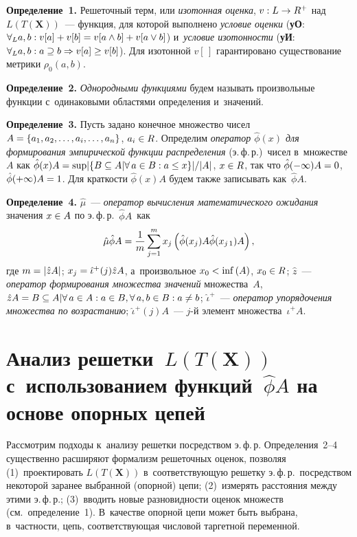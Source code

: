 \begin{multicols}{2}
     \noindent
     \textbf{Определение~1.} Решеточный терм, или \textit{изотонная 
оценка}, $v: L\hm\to R^+$ над $L(T(\mathbf{X}))$~--- функция, для которой 
выполнено \textit{условие оценки} (\textbf{уО}:  $\forall_L a,b: 
v[a]\hm+v[b]\hm=v[a\wedge b]\hm+ v[a\vee b]$) и~\textit{условие изотонности} 
(\textbf{уИ}: $\forall_L a,b: a \hm\supseteq b \hm\Rightarrow  v[a]\hm\geq v[b]$). Для изотонной 
$v[\,]$ гарантировано существование метрики $\rho_0(a,b)$.
     \smallskip
     
     \noindent
     \textbf{Определение~2.} \textit{Однородными функциями} будем 
называть произвольные функции с~одинаковыми областями определения и~значений. 
     
     \smallskip
     \noindent
     \textbf{Определение~3.} Пусть задано конечное множество чисел 
$A\hm= \{a_1,a_2, \ldots , a_i, \ldots, a_n\}$, $a_i\hm\in R$. Определим 
\textit{оператор $\hat{\phi}(x)$ для формирования эмпирической функции 
распределения} (э.\,ф.\,р.)\ чисел в~множестве~$A$ как $\hat{\phi}(x) A\hm= 
\mathrm{sup}\vert \{B\hm\subseteq A\vert \forall\,a\hm\in B: a\hm\leq x\}\vert / 
\vert A\vert$, $x\hm\in R$, так что $\hat{\phi}(-\infty) A\hm=0$, $\hat{\phi} 
(+\infty)A\hm=1$. Для краткости $\hat{\phi}(x)A$ будем также записывать 
как~$\hat{\phi}A$. 
     
     \smallskip
     
     \noindent
     \textbf{Определение~4.} $\hat{\mu}$~--- \textit{оператор вычисления 
математического ожидания} значения $x\hm\in A$ по э.\,ф.\,р.~$\hat{\phi}A$~как 
$$
\hat{\mu} \hat{\phi}A= \displaystyle\frac{\displaystyle 1\mathstrut}{\displaystyle m\mathstrut} \sum\limits^m_{j=1} x_j \left(\hat{\phi}(x_j)A 
\hat{\phi}(x_{j\,1})A\right),
$$
 где $m\hm= \vert \hat{z}A\vert$; $x_j\hm= 
\hat{\iota}^+(j)\hat{z}A$, а~произвольное $x_0\hm< \mathrm{inf}\,(A)$, 
$x_0\hm\in R$;  $\hat{z}$~--- \textit{оператор формирования множества 
значений} множества~$A$, $\hat{z}A\hm= B\hm\subseteq A\vert \forall\,a\hm\in 
A: a\hm\in B, \forall\,a,b \hm\in B: a\not= b$; $\hat{\iota}^+$~--- \textit{оператор 
упорядочения множества по возрастанию};  
$\hat{\iota}^+(j)A$~--- $j$-й элемент множества~$\hat{\iota}^+A$. 

\section{Анализ решетки~$L(T(\mathbf{X}))$ с~использованием 
функций~$\hat{\phi}A$ на основе опорных цепей}
     
     Рассмотрим подходы к~анализу решетки   посредством э.\,ф.\,р. 
Определения~2--4 существенно расширяют формализм решеточных оценок, 
позволяя (1)~проектировать $L(T(\mathbf{X}))$ в~соответствующую решетку 
э.\,ф.\,р.\ посредством некоторой заранее выбранной (опорной) цепи; 
(2)~измерять расстояния между этими э.\,ф.\,р.; (3)~вводить новые 
разновидности оценок множеств (см.\ определение~1). В~качестве опорной цепи 
может быть выбрана, в~част\-ности, цепь, соответствующая числовой таргетной 
переменной.


\end{multicols}
